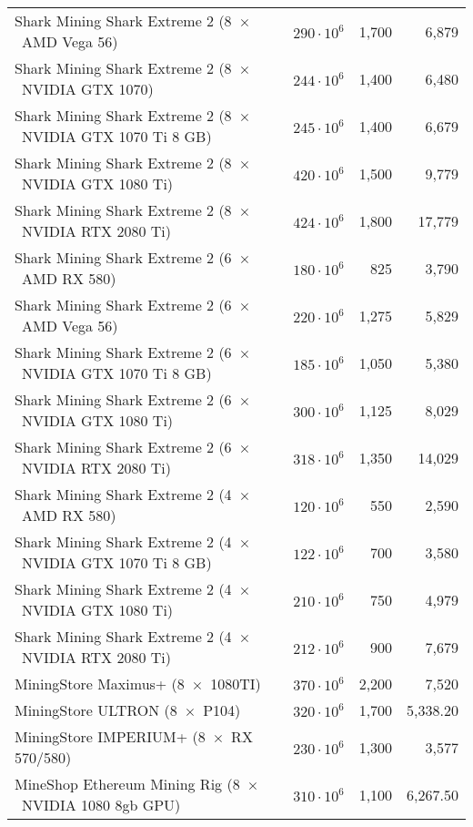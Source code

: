 \begin{longtable}{|p{}|r|r|r|}
  Shark Mining Shark Extreme 2 (8~$\times$~AMD Vega 56)               & $290 \cdot 10^6$ & 1,700 & 6,879 \\
  Shark Mining Shark Extreme 2 (8~$\times$~NVIDIA GTX 1070)           & $244 \cdot 10^6$ & 1,400 & 6,480 \\
  Shark Mining Shark Extreme 2 (8~$\times$~NVIDIA GTX 1070 Ti 8 GB)   & $245 \cdot 10^6$ & 1,400 & 6,679 \\
  Shark Mining Shark Extreme 2 (8~$\times$~NVIDIA GTX 1080 Ti)        & $420 \cdot 10^6$ & 1,500 & 9,779 \\
  Shark Mining Shark Extreme 2 (8~$\times$~NVIDIA RTX 2080 Ti)        & $424 \cdot 10^6$ & 1,800 & 17,779 \\
  Shark Mining Shark Extreme 2 (6~$\times$~AMD RX 580)                & $180 \cdot 10^6$ & 825 & 3,790 \\
  Shark Mining Shark Extreme 2 (6~$\times$~AMD Vega 56)               & $220 \cdot 10^6$ & 1,275 & 5,829 \\
  Shark Mining Shark Extreme 2 (6~$\times$~NVIDIA GTX 1070 Ti 8 GB)   & $185 \cdot 10^6$ & 1,050 & 5,380 \\
  Shark Mining Shark Extreme 2 (6~$\times$~NVIDIA GTX 1080 Ti)        & $300 \cdot 10^6$ & 1,125 & 8,029 \\
  Shark Mining Shark Extreme 2 (6~$\times$~NVIDIA RTX 2080 Ti)        & $318 \cdot 10^6$ & 1,350 & 14,029 \\
  Shark Mining Shark Extreme 2 (4~$\times$~AMD RX 580)                & $120 \cdot 10^6$ & 550 & 2,590 \\
  Shark Mining Shark Extreme 2 (4~$\times$~NVIDIA GTX 1070 Ti 8 GB)   & $122 \cdot 10^6$ & 700 & 3,580 \\
  Shark Mining Shark Extreme 2 (4~$\times$~NVIDIA GTX 1080 Ti)        & $210 \cdot 10^6$ & 750 & 4,979 \\
  Shark Mining Shark Extreme 2 (4~$\times$~NVIDIA RTX 2080 Ti)        & $212 \cdot 10^6$ & 900 & 7,679 \\
  MiningStore Maximus+ (8~$\times$~1080TI)                            & $370 \cdot 10^6$ & 2,200 & 7,520 \\
  MiningStore ULTRON (8~$\times$~P104)                                & $320 \cdot 10^6$ & 1,700 & 5,338.20 \\
  MiningStore IMPERIUM+ (8~$\times$~RX 570/580)                       & $230 \cdot 10^6$ & 1,300 & 3,577 \\
  MineShop Ethereum Mining Rig (8~$\times$~NVIDIA 1080 8gb GPU)       & $310 \cdot 10^6$ & 1,100 & 6,267.50 \\

\end{longtable}
